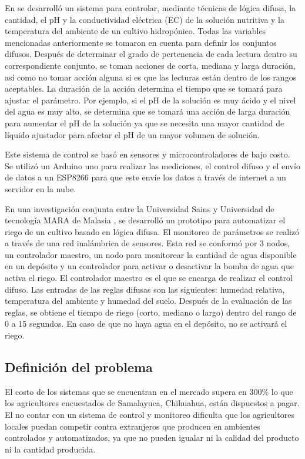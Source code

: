 En \cite{fuzzy_logic_controller} se desarrolló un sistema para controlar, mediante técnicas de lógica difusa, la cantidad, el pH y la conductividad eléctrica (EC) de la solución nutritiva y la temperatura del ambiente de un cultivo hidropónico. Todas las variables mencionadas anteriormente se tomaron en cuenta para definir los conjuntos difusos. Después de determinar el grado de pertenencia de cada lectura dentro su correspondiente conjunto, se toman acciones de corta, mediana y larga duración, así como no tomar acción alguna si es que las lecturas están dentro de los rangos aceptables. La duración de la acción determina el tiempo que se tomará para ajustar el parámetro. Por ejemplo, si el pH de la solución es muy ácido y el nivel del agua es muy alto, se determina que se tomará una acción de larga duración para aumentar el pH de la solución ya que se necesita una mayor cantidad de líquido ajustador para afectar el pH de un mayor volumen de solución. 

Este sistema de control \cite{fuzzy_logic_controller} se basó en sensores y microcontroladores de bajo costo. Se utilizó un Arduino uno para realizar las mediciones, el control difuso y el envío de datos a un ESP8266 para que este envíe los datos a través de internet a un servidor en la nube.

En una investigación conjunta entre la Universidad Sains y Universidad de tecnología MARA de Malasia \cite{fuzzy_systems_agriculture}, se desarrolló un prototipo para automatizar el riego de un cultivo basado en lógica difusa. El monitoreo de parámetros se realizó a través de una red inalámbrica de sensores. Esta red se conformó por 3 nodos, un controlador maestro, un nodo para monitorear la cantidad de agua disponible en un depósito y un controlador para activar o desactivar la bomba de agua que activa el riego. El controlador maestro es el que se encarga de realizar el control difuso. Las entradas de las reglas difusas son las siguientes: humedad relativa, temperatura del ambiente y humedad del suelo. Después de la evaluación de las reglas, se obtiene el tiempo de riego (corto, mediano o largo) dentro del rango de 0 a 15 segundos. En caso de que no haya agua en el depósito, no se activará el riego.


\subsection{Definición del problema}
El costo de los sistemas que se encuentran en el mercado supera en 300\% lo que los agricultores encuestados de Samalayuca, Chihuahua, están dispuestos a pagar. El no contar con un sistema de control y monitoreo dificulta que los agricultores locales puedan competir contra extranjeros que producen en ambientes controlados y automatizados, ya que no pueden igualar ni la calidad del producto ni la cantidad producida.